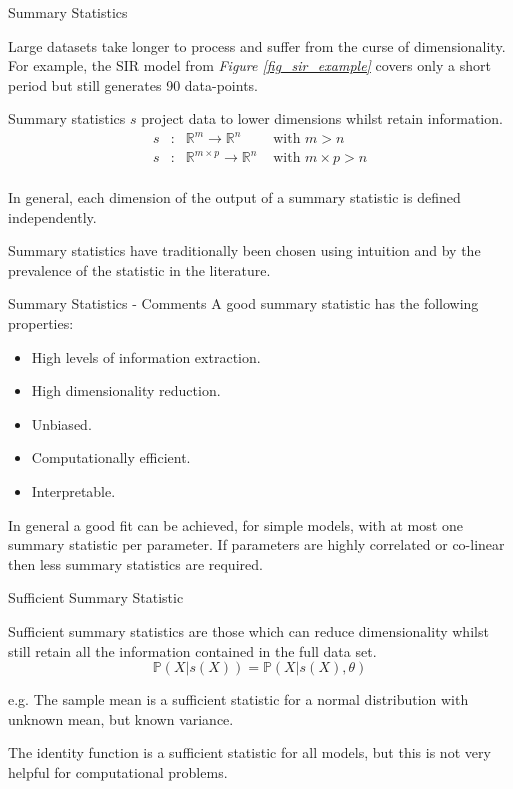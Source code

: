 \documentclass[aspectratio=169]{beamer}
\begin{document}
\begin{frame}{Summary Statistics}
  \par Large datasets take longer to process and suffer from the curse of dimensionality. For example, the SIR model from \textit{Figure \ref{fig_sir_example}} covers only a short period but still generates 90 data-points.
  \par Summary statistics $s$ project data to lower dimensions whilst retain information.
  \[\begin{array}{rcll}
    s&:&\mathbb{R}^m\to\mathbb{R}^n&\text{ with }m>n\\
    s&:&\mathbb{R}^{m\times p}\to\mathbb{R}^n&\text{ with }m\times p>n\\
  \end{array}\]
  \par In general, each dimension of the output of a summary statistic is defined independently.
  \par Summary statistics have traditionally been chosen using intuition and by the prevalence of the statistic in the literature.
\end{frame}

\begin{frame}{Summary Statistics - Comments}
  A good summary statistic has the following properties:
  \begin{multicols}{2}
    \begin{itemize}
      \item High levels of information extraction.
      \item High dimensionality reduction.
      \item Unbiased.
      \item Computationally efficient.
      \item Interpretable.
    \end{itemize}
  \end{multicols}
  In general a good fit can be achieved, for simple models, with at most one summary statistic per parameter. If parameters are highly correlated or co-linear then less summary statistics are required.
\end{frame}

\begin{frame}{Sufficient Summary Statistic}
  \par Sufficient summary statistics are those which can reduce dimensionality whilst still retain all the information contained in the full data set.
  \[ \mathbb{P}(X|s(X))=\mathbb{P}(X|s(X),\theta) \]
  \par e.g. The sample mean is a sufficient statistic for a normal distribution with unknown mean, but known variance.
  \par The identity function is a sufficient statistic for all models, but this is not very helpful for computational problems.
\end{frame}
\end{document}
